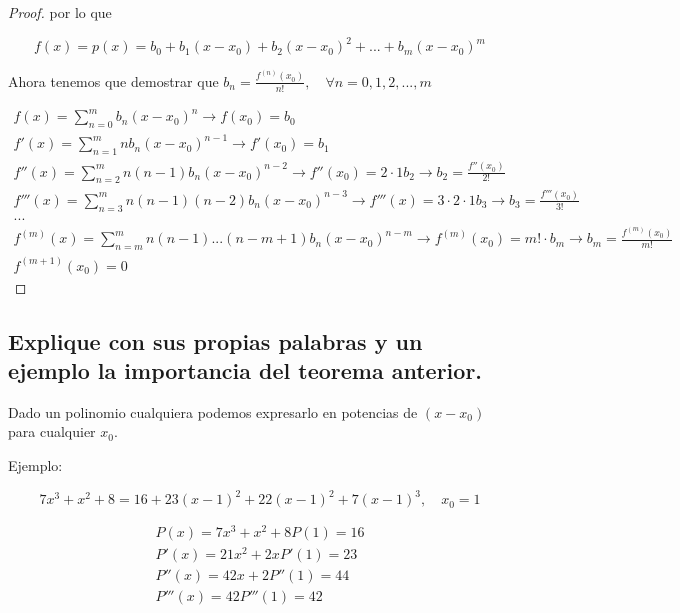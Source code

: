 \documentclass[12pt,oneside]{book}
\begin{document}
\begin{proof}
    por lo que

    \begin{equation*}
        f(x) = p(x) = b_0 + b_1(x-x_0) + b_2 (x-x_0)^2 + ... + b_m (x-x_0)^m
    \end{equation*}

    Ahora tenemos que demostrar que $b_n = \frac{f^{(n)}(x_0)}{n!}, \quad \forall n = 0,1,2,...,m$

    \begin{gather*}
        f(x) = \sum_{n=0}^m b_n (x-x_0)^{n} \rightarrow f(x_0)=b_0 \\
        f'(x) = \sum_{n=1}^m n b_n(x-x_0)^{n-1} \rightarrow f'(x_0) = b_1 \\
        f''(x) = \sum_{n=2}^m n(n-1) b_n(x-x_0)^{n-2} \rightarrow f''(x_0) =2 \cdot 1 b_2 \rightarrow b_2 = \frac{f''(x_0)}{2!} \\
        f'''(x) = \sum_{n=3}^m n(n-1)(n-2)b_n(x-x_0)^{n-3} \rightarrow f'''(x)=3 \cdot 2 \cdot 1b_3 \rightarrow b_3 = \frac{f'''(x_0)}{3!} \\
        ...\\
        f^{(m)}(x) = \sum_{n= m}^m n (n-1)...(n-m+1)b_n(x-x_0)^{n-m} \rightarrow f^{(m)}(x_0) = m!\cdot b_m \rightarrow b_m = \frac{f^{(m)}(x_0)}{m!} \\
        f^{(m+1)}(x_0)= 0
    \end{gather*}
\end{proof}

\subsection[Explicación]{Explique con sus propias palabras y un ejemplo la importancia del
teorema anterior.}

Dado un polinomio cualquiera podemos expresarlo en potencias de $(x-x_0)$ para cualquier $x_0$.

Ejemplo:

\begin{equation*}
    7x^3+x^2+8 = 16+23(x-1)^2+22(x-1)^2+7(x-1)^3, \quad x_0=1
\end{equation*}

\begin{gather*}
    P(x) = 7x^3+x^2+8P(1)=16 \\
    P'(x) = 21x^2 + 2xP'(1) = 23 \\
    P''(x) = 42x + 2 P''(1) = 44 \\
    P'''(x) = 42 P'''(1) = 42
\end{gather*}
\end{document}
